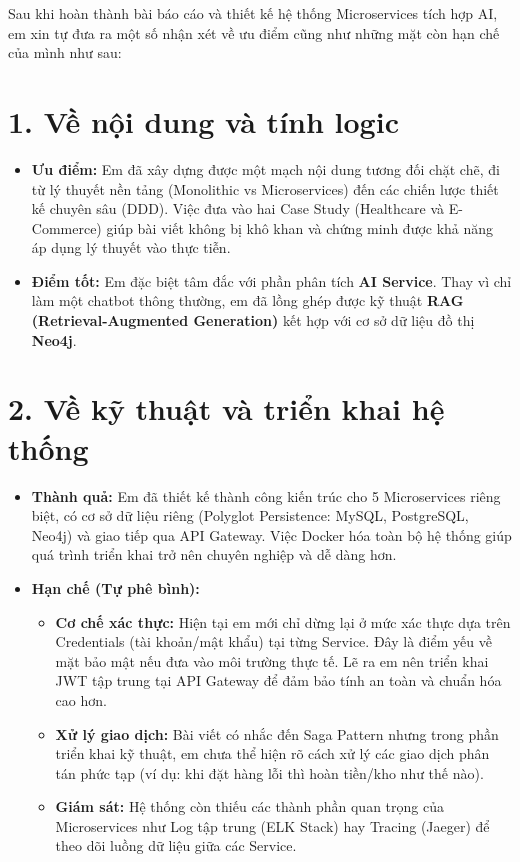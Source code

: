 \documentclass[12pt,a4paper]{report}
\begin{document}
Sau khi hoàn thành bài báo cáo và thiết kế hệ thống Microservices tích hợp AI, em xin tự đưa ra một số nhận xét về ưu điểm cũng như những mặt còn hạn chế của mình như sau:

\section*{1. Về nội dung và tính logic}
\begin{itemize}
    \item \textbf{Ưu điểm:} Em đã xây dựng được một mạch nội dung tương đối chặt chẽ, đi từ lý thuyết nền tảng (Monolithic vs Microservices) đến các chiến lược thiết kế chuyên sâu (DDD). Việc đưa vào hai Case Study (Healthcare và E-Commerce) giúp bài viết không bị khô khan và chứng minh được khả năng áp dụng lý thuyết vào thực tiễn.
    \item \textbf{Điểm tốt:} Em đặc biệt tâm đắc với phần phân tích \textbf{AI Service}. Thay vì chỉ làm một chatbot thông thường, em đã lồng ghép được kỹ thuật \textbf{RAG (Retrieval-Augmented Generation)} kết hợp với cơ sở dữ liệu đồ thị \textbf{Neo4j}. 
\end{itemize}

\section*{2. Về kỹ thuật và triển khai hệ thống}
\begin{itemize}
    \item \textbf{Thành quả:} Em đã thiết kế thành công kiến trúc cho 5 Microservices riêng biệt, có cơ sở dữ liệu riêng (Polyglot Persistence: MySQL, PostgreSQL, Neo4j) và giao tiếp qua API Gateway. Việc Docker hóa toàn bộ hệ thống giúp quá trình triển khai trở nên chuyên nghiệp và dễ dàng hơn.
    \item \textbf{Hạn chế (Tự phê bình):} 
    \begin{itemize}
        \item \textbf{Cơ chế xác thực:} Hiện tại em mới chỉ dừng lại ở mức xác thực dựa trên Credentials (tài khoản/mật khẩu) tại từng Service. Đây là điểm yếu về mặt bảo mật nếu đưa vào môi trường thực tế. Lẽ ra em nên triển khai JWT tập trung tại API Gateway để đảm bảo tính an toàn và chuẩn hóa cao hơn.
        \item \textbf{Xử lý giao dịch:} Bài viết có nhắc đến Saga Pattern nhưng trong phần triển khai kỹ thuật, em chưa thể hiện rõ cách xử lý các giao dịch phân tán phức tạp (ví dụ: khi đặt hàng lỗi thì hoàn tiền/kho như thế nào).
        \item \textbf{Giám sát:} Hệ thống còn thiếu các thành phần quan trọng của Microservices như Log tập trung (ELK Stack) hay Tracing (Jaeger) để theo dõi luồng dữ liệu giữa các Service.
    \end{itemize}
\end{itemize}
\end{document}
